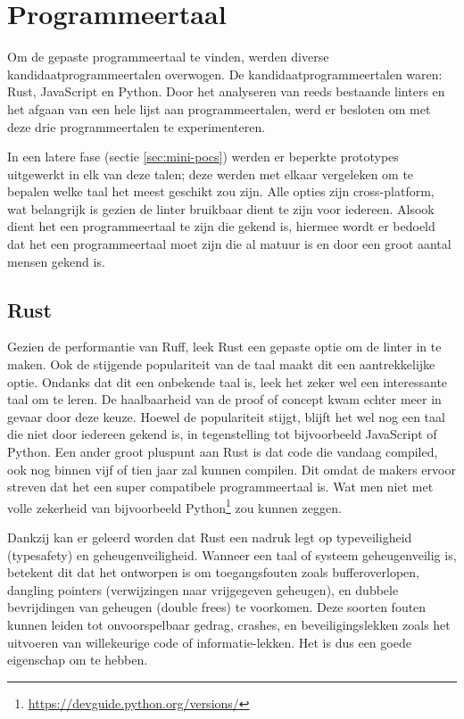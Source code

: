 \section{Programmeertaal}

Om de gepaste programmeertaal te vinden, werden diverse kandidaatprogrammeertalen overwogen. De kandidaatprogrammeertalen waren: Rust, JavaScript en Python. Door het analyseren van reeds bestaande linters en het afgaan van een hele lijst aan programmeertalen, werd er besloten om met deze drie programmeertalen te experimenteren.

In een latere fase (sectie \ref{sec:mini-pocs}) werden er beperkte prototypes uitgewerkt in elk van deze talen; deze werden met elkaar vergeleken om te bepalen welke taal het meest geschikt zou zijn. Alle opties zijn cross-platform, wat belangrijk is gezien de linter bruikbaar dient te zijn voor iedereen. Alsook dient het een programmeertaal te zijn die gekend is, hiermee wordt er bedoeld dat het een programmeertaal moet zijn die al matuur is en door een groot aantal mensen gekend is.

\subsection{Rust}
Gezien de performantie van Ruff, leek Rust een gepaste optie om de linter in te maken. Ook de stijgende populariteit van de taal maakt dit een aantrekkelijke optie. Ondanks dat dit een onbekende taal is, leek het zeker wel een interessante taal om te leren. De haalbaarheid van de proof of concept kwam echter meer in gevaar door deze keuze. Hoewel de populariteit stijgt, blijft het wel nog een taal die niet door iedereen gekend is, in tegenstelling tot bijvoorbeeld JavaScript of Python. Een ander groot pluspunt aan Rust is dat code die vandaag compiled, ook nog binnen vijf of tien jaar zal kunnen compilen. Dit omdat de makers ervoor streven dat het een super compatibele programmeertaal is. Wat men niet met volle zekerheid van bijvoorbeeld Python\footnote{\url{https://devguide.python.org/versions/}} zou kunnen zeggen.

Dankzij \textcite{Klabnik2022} kan er geleerd worden dat Rust een nadruk legt op typeveiligheid (typesafety) en geheugenveiligheid. Wanneer een taal of systeem geheugenveilig is, betekent dit dat het ontworpen is om toegangsfouten zoals bufferoverlopen, dangling pointers (verwijzingen naar vrijgegeven geheugen), en dubbele bevrijdingen van geheugen (double frees) te voorkomen. Deze soorten fouten kunnen leiden tot onvoorspelbaar gedrag, crashes, en beveiligingslekken zoals het uitvoeren van willekeurige code of informatie-lekken. Het is dus een goede eigenschap om te hebben.

